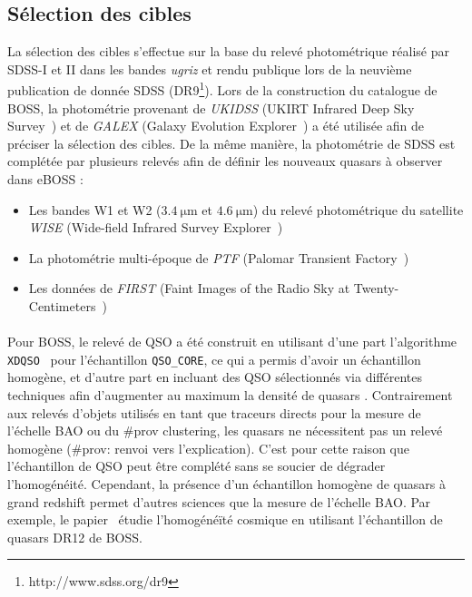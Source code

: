 \subsection{Sélection des cibles}

La sélection des cibles s'effectue sur la base du relevé photométrique réalisé par SDSS-I et II dans les bandes \emph{ugriz} et rendu publique lors de la neuvième publication de donnée SDSS (DR9\footnote{http://www.sdss.org/dr9}).
Lors de la construction du catalogue de BOSS, la photométrie provenant de \emph{UKIDSS} (UKIRT Infrared Deep Sky Survey~\cite{Lawrence2006}) et de \emph{GALEX} (Galaxy Evolution Explorer~\cite{Martin2004}) a été utilisée afin de préciser la sélection des cibles.
De la même manière, la photométrie de SDSS est complétée par plusieurs relevés afin de définir les nouveaux quasars à observer dans eBOSS :
\begin{itemize}
\item Les bandes W1 et W2 ($\SI{3,4}{\micro\meter}$ et $\SI{4,6}{\micro\meter}$) du relevé photométrique du satellite \emph{WISE} (Wide-field Infrared Survey Explorer~\cite{Wright2010})
\item La photométrie multi-époque de \emph{PTF} (Palomar Transient Factory~\cite{Law2009})
\item Les données de \emph{FIRST} (Faint Images of the Radio Sky at Twenty-Centimeters~\cite{Becker1995})
\end{itemize}


\paragraph{} Pour BOSS, le relevé de QSO a été construit en utilisant d'une part l'algorithme \texttt{XDQSO}~\cite{Bovy2010a} pour l'échantillon \texttt{QSO\_CORE}, ce qui a permis d'avoir un échantillon homogène, et d'autre part en incluant des QSO sélectionnés via différentes techniques afin d'augmenter au maximum la densité de quasars \lya{}.
Contrairement aux relevés d'objets utilisés en tant que traceurs directs pour la mesure de l'échelle BAO ou du \#prov clustering, les quasars \lya{} ne nécessitent pas un relevé homogène (\#prov: renvoi vers l'explication).
C'est pour cette raison que l'échantillon de QSO \lya{} peut être complété sans se soucier de dégrader l'homogénéité.
Cependant, la présence d'un échantillon homogène de quasars à grand redshift permet d'autres sciences que la mesure de l'échelle BAO.
Par exemple, le papier~\cite{Laurent2016} étudie l'homogénéïté cosmique en utilisant l'échantillon de quasars DR12 de BOSS.

